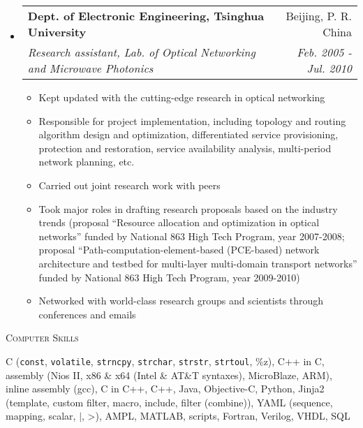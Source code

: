 \documentclass[letterpaper,11pt]{article}
\makeatletter
\newcommand{\resheading}[1]{{\noindent\large \colorbox{mygrey}{
\begin{minipage}{1.0\textwidth}{\textsc{#1 \vphantom{p\^{E}}}}\end{minipage}}}}
\newcommand{\ressubheading}[4]{
\begin{tabular*}{6.69in}{l@{\extracolsep{\fill}}r}
        \textbf{#1} & #2 \\
        \textit{#3} & \textit{#4} \\
\end{tabular*}\vspace{-6pt}
}
\newcommand{\resitem}[1]{\item #1 \vspace{-2pt}}
\makeatother
\begin{document}
\begin{CJK}{UTF8}{gbsn}
\begin{itemize}
\item
    \ressubheading{Dept. of Electronic Engineering, Tsinghua University}{Beijing, P. R. China}%
    {Research assistant, Lab. of Optical Networking and Microwave Photonics}{Feb. 2005 - Jul. 2010} %
    \begin{itemize}
        \resitem{Kept updated with the cutting-edge research in optical networking}
        \resitem{Responsible for project implementation, including topology and routing algorithm design and optimization,
        differentiated service provisioning, protection and restoration, service availability analysis, multi-period network planning, etc.}
        \resitem{Carried out joint research work with peers} %
        \resitem{Took major roles in drafting research proposals based on the industry trends
        (proposal ``Resource allocation and optimization in optical networks'' funded by National 863 High Tech Program, year 2007-2008; %
        proposal ``Path-computation-element-based (PCE-based) network architecture and testbed for multi-layer multi-domain transport
        networks'' funded by National 863 High Tech Program, year 2009-2010)} %
        \resitem{Networked with world-class research groups and scientists through conferences and emails} %
    \end{itemize}

\end{itemize}




\resheading{Computer Skills}%

\begin{description}
\setlength{\itemindent}{-0.1in}

\item[Programming Languages:] C ({\tt const}, {\tt volatile}, {\tt strncpy}, {\tt strchar}, {\tt strstr}, {\tt strtoul}, \%z), C++ in C,
assembly (Nios II, x86 \& x64 (Intel \& AT\&T syntaxes), MicroBlaze, ARM),
inline assembly (gcc), C in C++,
%
C++,
%
Java, Objective-C,
%
Python,
%
Jinja2 (template, custom filter, macro, include, filter (combine)), YAML (sequence, mapping, scalar, $|$, \textgreater),
AMPL, MATLAB,
%
scripts,
%
Fortran, Verilog, VHDL, SQL %


\end{description}
\end{CJK}
\end{document}
